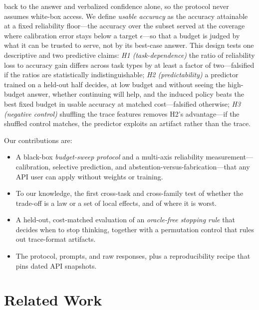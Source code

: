 \documentclass[11pt]{article}
\begin{document}
back to the answer and verbalized confidence alone, so the protocol never
assumes white-box access.
We define \emph{usable accuracy} as the accuracy attainable at a fixed
reliability floor---the accuracy over the subset served at the coverage where
calibration error stays below a target $\epsilon$---so that a budget is judged
by what it can be trusted to serve, not by its best-case answer.
This design tests one descriptive and two predictive claims:
\emph{H1 (task-dependence)} the ratio of reliability loss to accuracy gain
differs across task types by at least a factor of two---falsified if the
ratios are statistically indistinguishable;
\emph{H2 (predictability)} a predictor trained on a held-out half decides, at
low budget and without seeing the high-budget answer, whether continuing will
help, and the induced policy beats the best fixed budget in usable accuracy at
matched cost---falsified otherwise;
\emph{H3 (negative control)} shuffling the trace features removes H2's
advantage---if the shuffled control matches, the predictor exploits an
artifact rather than the trace.

Our contributions are:
\begin{itemize}
  \item A black-box \emph{budget-sweep protocol} and a multi-axis reliability
  measurement---calibration, selective prediction, and
  abstention-versus-fabrication---that any API user can apply without weights
  or training.
  \item To our knowledge, the first cross-task and cross-family test of
  whether the trade-off is a law or a set of local effects, and of where it
  is worst.
  \item A held-out, cost-matched evaluation of an \emph{oracle-free stopping
  rule} that decides when to stop thinking, together with a permutation
  control that rules out trace-format artifacts.
  \item The protocol, prompts, and raw responses, plus a reproducibility
  recipe that pins dated API snapshots.
\end{itemize}

\section{Related Work}
\end{document}
